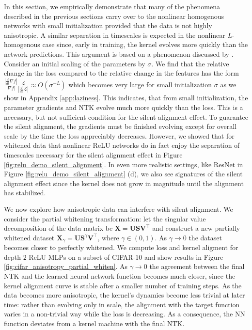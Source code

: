 \documentclass{article} %
\begin{document}
In this section, we empirically demonstrate that many of the phenomena described in the previous sections carry over to the nonlinear homogenous networks with small initialization provided that the data is not highly anisotropic. A similar separation in timescales is expected in the nonlinear $L$-homogenous case since, early in training, the kernel evolves more quickly than the network predictions. This argument is based on a phenomenon discussed by  \citet{Chizat2019OnLT}. Consider an initial scaling of the parameters by $\sigma$. We find that the relative change in the loss compared to the relative change in the features has the form $\frac{|\frac{d}{dt} \nabla f| }{|\nabla f|} \frac{\mathcal L}{|\frac{d}{dt} \mathcal L|} \approx O(\sigma^{-L})$ which becomes very large for small initialization $\sigma$ as we show in Appendix \ref{app:laziness}. This indicates, that from small initialization, the parameter gradients and NTK evolve much more quickly than the loss. This is a necessary, but not sufficient condition for the silent alignment effect. To guarantee the silent alignment, the gradients must be finished evolving except for overall scale by the time the loss appreciably decreases. However, we showed that for whitened data that nonlinear ReLU networks do in fact enjoy the separation of timescales necessary for the silent alignment effect in Figure \ref{fig:relu_demo_silent_alignment}. In even more realistic settings, like ResNet in Figure \ref{fig:relu_demo_silent_alignment} (d), we also see signatures of the silent alignment effect since the kernel does not grow in magnitude until the alignment has stabilized. 

We now explore how anisotropic data can interfere with silent alignment. We consider the partial whitening transformation: let the singular value decomposition of the data matrix be $\bm X = \bm U \bm S \bm V^\top$ and construct a new partially whitened dataset $\bm X_{\gamma} = \bm U \bm S^{\gamma} \bm V^\top$, where $\gamma \in (0,1)$. As $\gamma \to 0$ the dataset becomes closer to perfectly whitened. We compute loss and kernel aligment for depth 2 ReLU MLPs on a subset of CIFAR-10 and show results in Figure \ref{fig:cifar_anisotropy_partial_whiten}. As $\gamma \to 0$ the agreement between the final NTK and the learned neural network function becomes much closer, since the kernel alignment curve is stable after a smaller number of training steps. As the data becomes more anisotropic, the kernel's dynamics become less trivial at later time: rather than evolving only in scale, the alignment with the target function varies in a non-trivial way while the loss is decreasing. As a consequence, the NN function deviates from a kernel machine with the final NTK.
\end{document}
